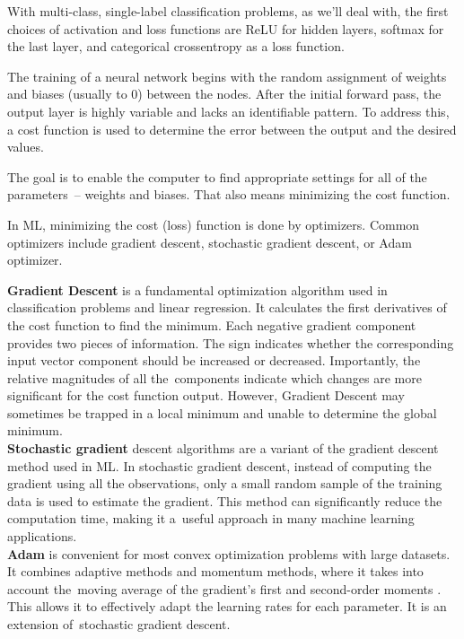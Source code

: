With multi-class, single-label classification problems, as we'll deal with, the first choices of activation and loss functions are ReLU for hidden layers, softmax for the last layer, and categorical crossentropy as a loss function.



The training of a neural network begins with the random assignment of weights and biases (usually to 0) between the nodes. After the initial forward pass, the output layer is highly variable and lacks an identifiable pattern. To address this, a cost function is used to determine the error between the output and the desired values. 

The goal is to enable the computer to find appropriate settings for all of the parameters~-- weights and biases. That also means minimizing the cost function. \newline

In ML, minimizing the cost (loss) function is done by optimizers. Common optimizers include gradient descent, stochastic gradient descent, or Adam optimizer.


\textbf{Gradient Descent} is a fundamental optimization algorithm used in classification problems and linear regression. It calculates the first derivatives of the cost function to find the minimum. 
Each negative gradient component provides two pieces of information. The sign indicates whether the corresponding input vector component should be increased or decreased. Importantly, the relative magnitudes of all the~components indicate which changes are more significant for the cost function output.
However, Gradient Descent may sometimes be trapped in a local minimum and unable to determine the global minimum.\\

\textbf{Stochastic gradient} descent algorithms are a variant of the gradient descent method used in ML. In stochastic gradient descent, instead of computing the gradient using all the observations, only a small random sample of the training data is used to estimate the gradient. This method can significantly reduce the computation time, making it a~useful approach in many machine learning applications.\\

\textbf{Adam} is convenient for most convex optimization problems with large datasets. It combines adaptive methods and momentum methods, where it takes into account the~moving average of the gradient's first and second-order moments \cite{Reyad2023}. This allows it to effectively adapt the learning rates for each parameter.
It is an extension of~stochastic gradient descent.

